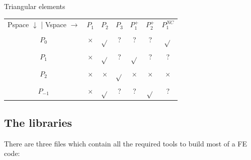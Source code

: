 \begin{center}
Triangular elements\\
\begin{tabular}{ccccccc}
\hline
Pspace $\downarrow$ | Vspace $\rightarrow$   
         & $P_1$    & $P_2$     & $P_3$     & $P_1^+$   & $P_2^+$   & $P_1^{NC}$  \\
$P_0$    & $\times$ & $\sqrt{}$ & ?         &  ?        &  ?        & $\sqrt{}$   \\
$P_1$    & $\times$ & $\sqrt{}$ & ?         & $\sqrt{}$ &  ?        & ?           \\
$P_2$    & $\times$ & $\times$  & $\sqrt{}$ & $\times$  & $\times$  & $\times$    \\
$P_{-1}$ & $\times$ & $\sqrt{}$ & ?         &  ?        & $\sqrt{}$ & ?           \\
\hline
\end{tabular}
\end{center}




\newpage
\subsection*{The libraries}

There are three files which contain all the required tools to build most of a FE code:

